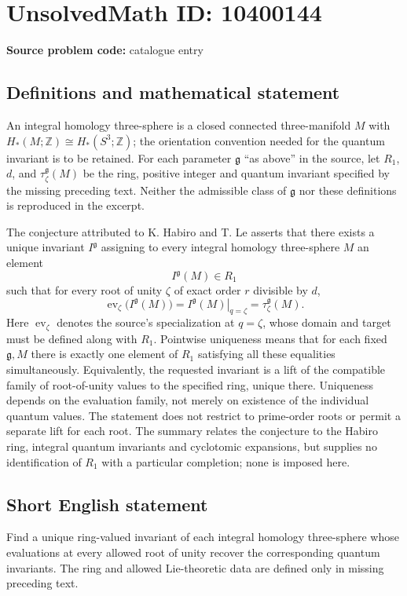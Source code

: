 \documentclass[11pt]{article}
\newcommand{\Z}{\mathbb{Z}}
\begin{document}
\section*{UnsolvedMath ID: 10400144}
\textbf{Source problem code:} catalogue entry
\subsection{Definitions and mathematical statement}
An integral homology three-sphere is a closed connected three-manifold \(M\) with \(H_*(M;\Z)\cong H_*(S^3;\Z)\); the orientation convention needed for the quantum invariant is to be retained. For each parameter \(\mathfrak g\) ``as above'' in the source, let \(R_1\), \(d\), and \(\tau_\zeta^{\mathfrak g}(M)\) be the ring, positive integer and quantum invariant specified by the missing preceding text. Neither the admissible class of \(\mathfrak g\) nor these definitions is reproduced in the excerpt.

The conjecture attributed to K. Habiro and T. Le asserts that there exists a unique invariant \(I^{\mathfrak g}\) assigning to every integral homology three-sphere \(M\) an element
\[I^{\mathfrak g}(M)\in R_1\]
such that for every root of unity \(\zeta\) of exact order \(r\) divisible by \(d\),
\[\operatorname{ev}_\zeta\bigl(I^{\mathfrak g}(M)\bigr)
=\left.I^{\mathfrak g}(M)\right|_{q=\zeta}
=\tau_\zeta^{\mathfrak g}(M).\]
Here \(\operatorname{ev}_\zeta\) denotes the source's specialization at \(q=\zeta\), whose domain and target must be defined along with \(R_1\). Pointwise uniqueness means that for each fixed \(\mathfrak g,M\) there is exactly one element of \(R_1\) satisfying all these equalities simultaneously. Equivalently, the requested invariant is a lift of the compatible family of root-of-unity values to the specified ring, unique there. Uniqueness depends on the evaluation family, not merely on existence of the individual quantum values. The statement does not restrict to prime-order roots or permit a separate lift for each root. The summary relates the conjecture to the Habiro ring, integral quantum invariants and cyclotomic expansions, but supplies no identification of \(R_1\) with a particular completion; none is imposed here.
\subsection{Short English statement}
Find a unique ring-valued invariant of each integral homology three-sphere whose evaluations at every allowed root of unity recover the corresponding quantum invariants. The ring and allowed Lie-theoretic data are defined only in missing preceding text.
\end{document}
